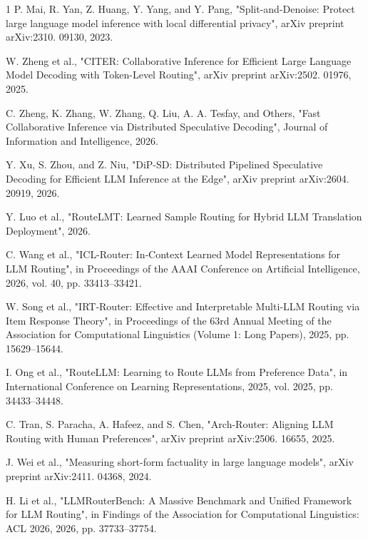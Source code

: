 \documentclass[lettersize,journal]{IEEEtran}
\begin{document}
\begin{thebibliography}{1}
P. Mai, R. Yan, Z. Huang, Y. Yang, and Y. Pang, "Split-and-Denoise: Protect large language model inference with local differential privacy", arXiv preprint arXiv:2310. 09130, 2023.

W. Zheng et al., "CITER: Collaborative Inference for Efficient Large Language Model Decoding with Token-Level Routing", arXiv preprint arXiv:2502. 01976, 2025.

C. Zheng, K. Zhang, W. Zhang, Q. Liu, A. A. Tesfay, and Others, "Fast Collaborative Inference via Distributed Speculative Decoding", Journal of Information and Intelligence, 2026.

Y. Xu, S. Zhou, and Z. Niu, "DiP-SD: Distributed Pipelined Speculative Decoding for Efficient LLM Inference at the Edge", arXiv preprint arXiv:2604. 20919, 2026.

Y. Luo et al., "RouteLMT: Learned Sample Routing for Hybrid LLM Translation Deployment", 2026.

C. Wang et al., "ICL-Router: In‑Context Learned Model Representations for LLM Routing", in Proceedings of the AAAI Conference on Artificial Intelligence, 2026, vol. 40, pp. 33413–33421.

W. Song et al., "IRT‑Router: Effective and Interpretable Multi‑LLM Routing via Item Response Theory", in Proceedings of the 63rd Annual Meeting of the Association for Computational Linguistics (Volume 1: Long Papers), 2025, pp. 15629–15644.

I. Ong et al., "RouteLLM: Learning to Route LLMs from Preference Data", in International Conference on Learning Representations, 2025, vol. 2025, pp. 34433–34448.

C. Tran, S. Paracha, A. Hafeez, and S. Chen, "Arch-Router: Aligning LLM Routing with Human Preferences", arXiv preprint arXiv:2506. 16655, 2025.

J. Wei et al., "Measuring short-form factuality in large language models", arXiv preprint arXiv:2411. 04368, 2024.

H. Li et al., "LLMRouterBench: A Massive Benchmark and Unified Framework for LLM Routing", in Findings of the Association for Computational Linguistics: ACL 2026, 2026, pp. 37733–37754.

\end{thebibliography}

\newpage


\vfill
\end{document}
